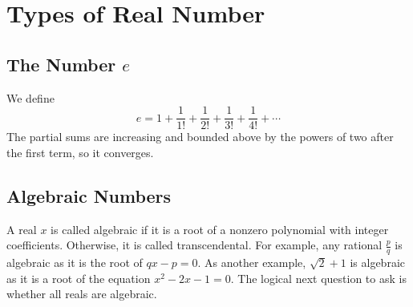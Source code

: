 \documentclass{article}
\begin{document}
	\section{Types of Real Number}
	\subsection{The Number $e$}
	We define
	\[ e = 1 + \frac{1}{1!} + \frac{1}{2!} + \frac{1}{3!} + \frac{1}{4!} + \cdots \]
	The partial sums are increasing and bounded above by the powers of two after the first term, so it converges.

	\subsection{Algebraic Numbers}
	A real $x$ is called algebraic if it is a root of a nonzero polynomial with integer coefficients. Otherwise, it is called transcendental. For example, any rational $\frac{p}{q}$ is algebraic as it is the root of $qx-p=0$. As another example, $\sqrt 2 + 1$ is algebraic as it is a root of the equation $x^2 - 2x - 1 = 0$. The logical next question to ask is whether all reals are algebraic.
\end{document}
